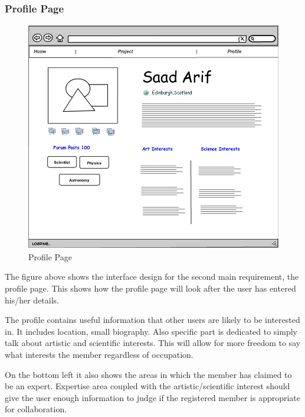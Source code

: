 \documentclass[a4paper,oneside,11pt]{report}
\begin{document}
\subsubsection{Profile Page}
\begin{figure}[!ht]
\centering
\includegraphics[width=\textwidth,height=10cm]{Profile.jpg}
\caption{Profile Page}
\end{figure}

The figure above shows the interface design for the second main requirement, the profile page. This shows how the profile page will look after the user has entered his/her details.


The profile contains useful information that other users are likely to be interested in. It includes location, small biography. Also specific part is dedicated to simply talk about artistic and scientific interests. This will allow for more freedom to say what interests the member regardless of occupation.

On the bottom left it also shows the areas in which the member has claimed to be an expert. Expertise area coupled with the artistic/scientific interest should give the user enough information to judge if the registered member is appropriate for collaboration.
\pagebreak
\end{document}

